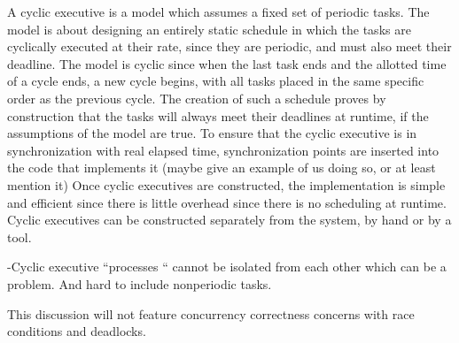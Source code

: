 A cyclic executive is a model which assumes a fixed set of periodic tasks. The model is about designing an entirely static schedule in which the tasks are cyclically executed at their rate, since they are periodic, and must also meet their deadline. The model is cyclic since when the last task ends and the allotted time of a cycle ends, a new cycle begins, with all tasks placed in the same specific order as the previous cycle. The creation of such a schedule proves by construction that the tasks will always meet their deadlines at runtime, if the assumptions of the model are true. \newline
To ensure that the cyclic executive is in synchronization with real elapsed time, synchronization points are inserted into the code that implements it (maybe give an example of us doing so, or at least mention it)
Once cyclic executives are constructed, the implementation is simple and efficient since there is little overhead since there is no scheduling at runtime. Cyclic executives can be constructed separately from the system, by hand or by a tool.

-Cyclic executive “processes “ cannot be isolated from each other which can be a problem. And hard to include nonperiodic tasks.

This discussion will not feature concurrency correctness concerns with race conditions and deadlocks.

